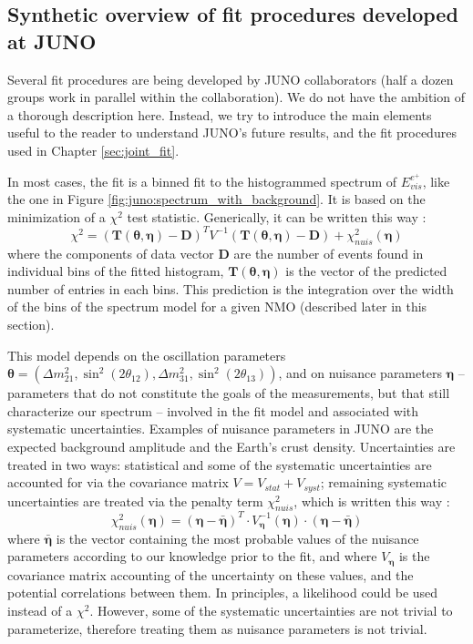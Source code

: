 \documentclass[../main.tex]{subfiles}
\begin{document}
\subsection{Synthetic overview of fit procedures developed at JUNO}
\label{sec:juno:fit:subatech}

Several fit procedures are being developed by JUNO collaborators (half a dozen groups work in parallel within the collaboration). We do not have the ambition of a thorough description here. Instead, we try to introduce the main elements useful to the reader to understand JUNO's future results, and the fit procedures used in Chapter \ref{sec:joint_fit}.

In most cases, the fit is a binned fit to the histogrammed spectrum of $E_{vis}^{e^+}$, like the one in Figure \ref{fig:juno:spectrum_with_background}. It is based on the minimization of a $\chi^2$ test statistic. Generically, it can be written this way :
\begin{equation}
  \label{eq:juno:chi2}
  \chi^2= \left(\bm{T}(\bm{\theta},\bm{\eta}) - \bm{D}  \right)^T V^{-1} \left(\bm{T}(\bm{\theta},\bm{\eta}) - \bm{D} \right) + \chi^2_{nuis}(\bm{\eta})
\end{equation}
where the components of data vector $\bm{D}$ are the number of events found in individual bins of the fitted histogram, $\bm{T}(\bm{\theta},\bm{\eta})$ is the vector of the predicted number of entries in each bins. This prediction is the integration over the width of the bins of the spectrum model for a given NMO (described later in this section).

This model depends on the oscillation parameters $\bm{\theta} = \left(\Delta m^2_{21}, \sin^2(2\theta_{12}), \Delta m^2_{31}, \sin^2(2\theta_{13} )\right)$, and on nuisance parameters $\bm{\eta}$ -- parameters that do not constitute the goals of the measurements, but that still characterize our spectrum -- involved in the fit model and associated with systematic uncertainties. Examples of nuisance parameters in JUNO are the expected background amplitude and the Earth's crust density.
Uncertainties are treated in two ways: statistical and some of the systematic uncertainties are accounted for via the covariance matrix $V = V_{stat}+V_{syst}$; remaining systematic uncertainties are treated via the penalty term $\chi^2_{nuis}$, which is written this way :
\begin{equation}
  \label{eq:juno:nuis}
  \chi^2_{nuis}\left(\bm{\eta}\right)= \left(\bm{\eta}-\bm{\bar{\eta}}\right)^T \cdot V^{-1}_{\bm{\eta}}(\bm{\eta})  \cdot \left(\bm{\eta}-\bm{\bar{\eta}}\right)
\end{equation}
where $\bm{\bar{\eta}}$ is the vector containing the most probable values of the nuisance parameters according to our knowledge prior to the fit, and where $V_{\bm{\eta}}$ is the covariance matrix accounting of the uncertainty on these values, and the potential correlations between them.
In principles, a likelihood could be used instead of a $\chi^2$. However, some of the systematic uncertainties are not trivial to parameterize, therefore treating them as nuisance parameters is not trivial.
\end{document}
